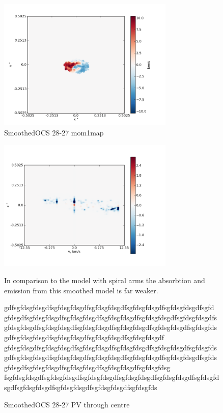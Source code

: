 \documentclass[useAMS,usenatbib]{mn2e}
\begin{document}
\begin{figure}
 \includegraphics[width=84mm]{Figures/sim/imagesmoothedOCS_28-27_30deg_mom1.png}

 \caption{SmoothedOCS 28-27 mom1map}
\end{figure}

\begin{figure}
 \includegraphics[width=84mm]{Figures/sim/imagesmoothedOCS_28-27_30deg_PV_centre.png}

In comparison to the model with spiral arms the absorbtion and emission from this smoothed model is far weaker.

gdfsgfdsgfdsgdfsgfdsgfdsgdfsgfdsgfdsgdfsgfdsgfdsgdfsgfdsgfdsgdfsgfd gfdsgdfsgfdsgfdsgdfsgfdsgfdsgdfsgfdsgfdsgdfsgfdsgfdsgdfsgfdsgfdsgdfsgfdsgfdsgdfsgfdsgfdsgdfsgfdsgfdsgdfsgfdsgfdsgdfsgfdsgfdsgdfsgfdsgfdsgdfsgfdsgfdsgdfsgfdsgfdsgdfsgfdsgfdsgdfsgfdsgfdsgdf gfdsgfdsgdfsgfdsgfdsgdfsgfdsgfdsgdfsgfdsgfdsgdfsgfdsgfdsgdfsgfdsgfdsgdfsgfdsgfdsgdfsgfdsgfdsgdfsgfdsgfdsgdfsgfdsgfdsgdfsgfdsgfdsgdfsgfdsgfdsgdfsgfdsgfdsgdfsgfdsgfdsgdfsgfdsgfdsgdfsgfdsgfdsg fsgfdsgfdsgdfsgfdsgfdsgdfsgfdsgfdsgdfsgfdsgfdsgdfsgfdsgfdsgdfsgfdsgfdsgdfsgfdsgfdsgdfsgfdsgfdsgdfsgfdsgfdsgdfsgfdsgfds

 \caption{SmoothedOCS 28-27 PV through centre}
\end{figure}
\end{document}
